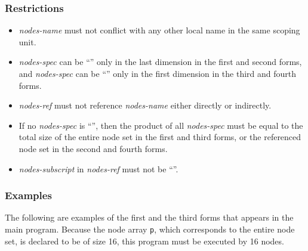\subsubsection*{Restrictions}

\begin{itemize}
\item {\it nodes-name} must not conflict with any other local name in
      the same scoping unit.
\item {\it nodes-spec} can be ``{\tt *}'' only in the last dimension in the first and second forms, and
{\it nodes-spec} can be ``{\tt *}'' only in the first dimension in the third and fourth forms.
\item {\it nodes-ref} must not reference {\it nodes-name} either
      directly or indirectly.
\item If no {\it nodes-spec} is ``{\tt *}'', then the product
      of all {\it nodes-spec} must be equal to the total size of the
      entire node set in the first and third forms, 
      or the referenced node set in the second and fourth forms.
%
\item {\it nodes-subscript} in {\it nodes-ref} must not be ``{\tt *}''.
\end{itemize}

\subsubsection*{Examples}

The following are examples of the first and the third forms that appears in
the main program. Because the node array {\tt p}, which corresponds to the
entire node set, is declared to be of size 16, this program must be
executed by 16 nodes.



